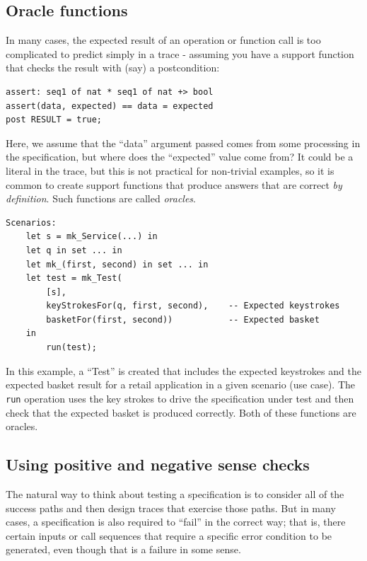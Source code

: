 \documentclass{overturerepchap}
\begin{document}
\subsection{Oracle functions}

In many cases, the expected result of an operation or function call is too
complicated to predict simply in a trace - assuming you have a support function
that checks the result with (say) a postcondition:

\small
\begin{lstlisting}
assert: seq1 of nat * seq1 of nat +> bool
assert(data, expected) == data = expected
post RESULT = true;
\end{lstlisting}
\normalsize

Here, we assume that the ``data'' argument passed comes from some processing in
the specification, but where does the ``expected'' value come from? It could be
a literal in the trace, but this is not practical for non-trivial examples, so
it is common to create support functions that produce answers that are correct
\emph{by definition}. Such functions are called \emph{oracles}.

\scriptsize
\begin{lstlisting}
Scenarios:
    let s = mk_Service(...) in
    let q in set ... in
    let mk_(first, second) in set ... in 
    let test = mk_Test(
        [s],
        keyStrokesFor(q, first, second),    -- Expected keystrokes
        basketFor(first, second))           -- Expected basket
    in
        run(test);
\end{lstlisting}
\normalsize

In this example, a ``Test'' is created that includes the expected keystrokes and
the expected basket result for a retail application in a given scenario (use
case). The \texttt{run} operation uses the key strokes to drive the
specification under test and then check that the expected basket is produced
correctly. Both of these functions are oracles.

\subsection{Using positive and negative sense checks}

The natural way to think about testing a specification is to consider all of the
success paths and then design traces that exercise those paths. But in many
cases, a specification is also required to ``fail'' in the correct way; that is,
there certain inputs or call sequences that require a specific error condition
to be generated, even though that is a failure in some sense.
\end{document}
